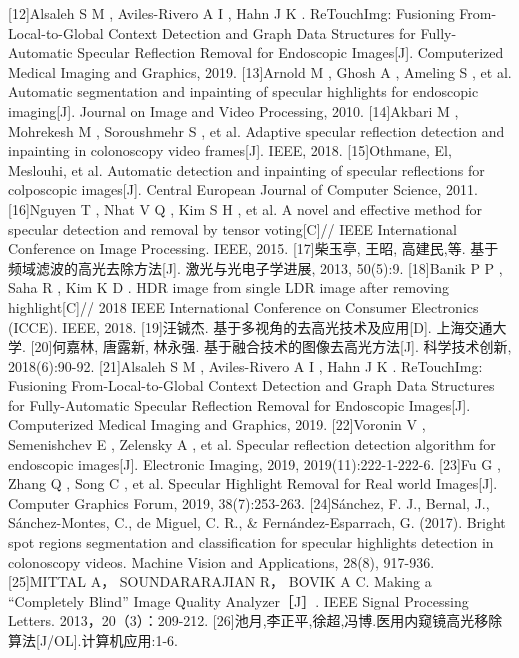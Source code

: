 \documentclass[UTF8,a4paper,12pt]{ctexart}
\begin{document}
[12]Alsaleh S M ,  Aviles-Rivero A I ,  Hahn J K . ReTouchImg: Fusioning From-Local-to-Global Context Detection and Graph Data Structures for Fully-Automatic Specular Reflection Removal for Endoscopic Images[J]. Computerized Medical Imaging and Graphics, 2019.
[13]Arnold M ,  Ghosh A ,  Ameling S , et al. Automatic segmentation and inpainting of specular highlights for endoscopic imaging[J]. Journal on Image and Video Processing, 2010.
[14]Akbari M ,  Mohrekesh M ,  Soroushmehr S , et al. Adaptive specular reflection detection and inpainting in colonoscopy video frames[J]. IEEE, 2018.
[15]Othmane, El, Meslouhi, et al. Automatic detection and inpainting of specular reflections for colposcopic images[J]. Central European Journal of Computer Science, 2011.
[16]Nguyen T ,  Nhat V Q ,  Kim S H , et al. A novel and effective method for specular detection and removal by tensor voting[C]// IEEE International Conference on Image Processing. IEEE, 2015.
[17]柴玉亭, 王昭, 高建民,等. 基于频域滤波的高光去除方法[J]. 激光与光电子学进展, 2013, 50(5):9.
[18]Banik P P ,  Saha R ,  Kim K D . HDR image from single LDR image after removing highlight[C]// 2018 IEEE International Conference on Consumer Electronics (ICCE). IEEE, 2018.
[19]汪铖杰. 基于多视角的去高光技术及应用[D]. 上海交通大学.
[20]何嘉林, 唐露新, 林永强. 基于融合技术的图像去高光方法[J]. 科学技术创新, 2018(6):90-92.
[21]Alsaleh S M ,  Aviles-Rivero A I ,  Hahn J K . ReTouchImg: Fusioning From-Local-to-Global Context Detection and Graph Data Structures for Fully-Automatic Specular Reflection Removal for Endoscopic Images[J]. Computerized Medical Imaging and Graphics, 2019. 
[22]Voronin V ,  Semenishchev E ,  Zelensky A , et al. Specular reflection detection algorithm for endoscopic images[J]. Electronic Imaging, 2019, 2019(11):222-1-222-6.
[23]Fu G ,  Zhang Q ,  Song C , et al. Specular Highlight Removal for Real world Images[J]. Computer Graphics Forum, 2019, 38(7):253-263.
[24]Sánchez, F. J., Bernal, J., Sánchez-Montes, C., de Miguel, C. R., & Fernández-Esparrach, G. (2017). Bright spot regions segmentation and classification for specular highlights detection in colonoscopy videos. Machine Vision and Applications, 28(8), 917-936.
[25]MITTAL A， SOUNDARARAJIAN R， BOVIK A C. Making a “Completely Blind” Image Quality Analyzer［J］. IEEE Signal Processing Letters. 2013，20（3）：209-212.
[26]池月,李正平,徐超,冯博.医用内窥镜高光移除算法[J/OL].计算机应用:1-6.
\end{document}
